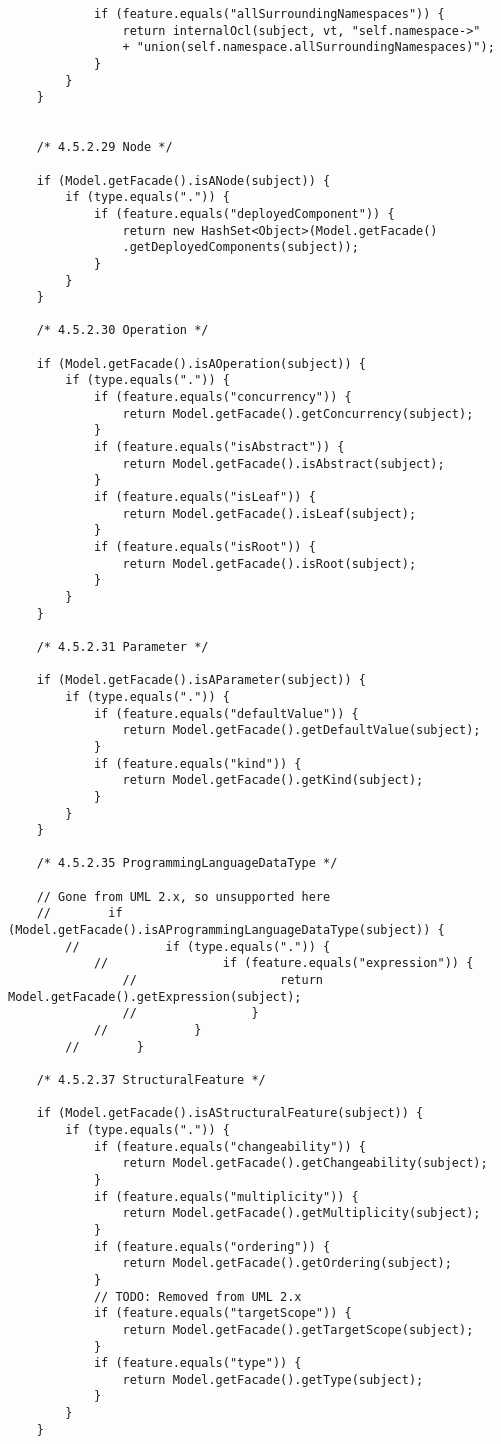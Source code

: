 \begin{mdframed}
\begin{lstlisting}
			if (feature.equals("allSurroundingNamespaces")) {
				return internalOcl(subject, vt, "self.namespace->"
				+ "union(self.namespace.allSurroundingNamespaces)");
			}                                               
		}                        
	}
	
	
	/* 4.5.2.29 Node */          
	
	if (Model.getFacade().isANode(subject)) {
		if (type.equals(".")) {
			if (feature.equals("deployedComponent")) {
				return new HashSet<Object>(Model.getFacade()
				.getDeployedComponents(subject));
			}                
		}
	}        
	
	/* 4.5.2.30 Operation */          
	
	if (Model.getFacade().isAOperation(subject)) {
		if (type.equals(".")) {
			if (feature.equals("concurrency")) {
				return Model.getFacade().getConcurrency(subject);
			}
			if (feature.equals("isAbstract")) {
				return Model.getFacade().isAbstract(subject);
			}
			if (feature.equals("isLeaf")) {
				return Model.getFacade().isLeaf(subject);
			}
			if (feature.equals("isRoot")) {
				return Model.getFacade().isRoot(subject);
			}
		}
	}                
	
	/* 4.5.2.31 Parameter */          
	
	if (Model.getFacade().isAParameter(subject)) {
		if (type.equals(".")) {
			if (feature.equals("defaultValue")) {
				return Model.getFacade().getDefaultValue(subject);
			}
			if (feature.equals("kind")) {
				return Model.getFacade().getKind(subject);
			}
		}
	}                
	
	/* 4.5.2.35 ProgrammingLanguageDataType */          
	
	// Gone from UML 2.x, so unsupported here
	//        if (Model.getFacade().isAProgrammingLanguageDataType(subject)) {
		//            if (type.equals(".")) {
			//                if (feature.equals("expression")) {
				//                    return Model.getFacade().getExpression(subject);
				//                }
			//            }
		//        }                
	
	/* 4.5.2.37 StructuralFeature */
	
	if (Model.getFacade().isAStructuralFeature(subject)) {
		if (type.equals(".")) {
			if (feature.equals("changeability")) {
				return Model.getFacade().getChangeability(subject);
			}
			if (feature.equals("multiplicity")) {
				return Model.getFacade().getMultiplicity(subject);
			}
			if (feature.equals("ordering")) {
				return Model.getFacade().getOrdering(subject);
			}
			// TODO: Removed from UML 2.x
			if (feature.equals("targetScope")) {
				return Model.getFacade().getTargetScope(subject);
			}
			if (feature.equals("type")) {
				return Model.getFacade().getType(subject);
			}
		}
	}        
	

\end{lstlisting}
\end{mdframed}

